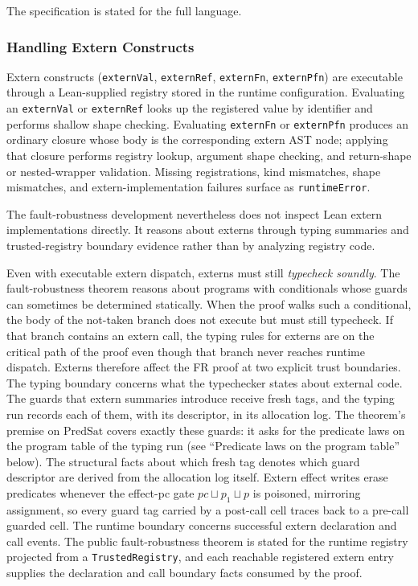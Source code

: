 \documentclass[12pt]{article}
\begin{document}
The specification is stated for the full language.

\subsubsection*{Handling Extern Constructs}

Extern constructs (\texttt{externVal}, \texttt{externRef}, \texttt{externFn},
\texttt{externPfn}) are executable through a Lean-supplied registry stored
in the runtime configuration.  Evaluating an \texttt{externVal} or
\texttt{externRef} looks up the
registered value by identifier and performs shallow shape checking.
Evaluating \texttt{externFn} or \texttt{externPfn} produces an ordinary closure
whose body is the corresponding extern AST node; applying that closure performs
registry lookup, argument shape checking, and return-shape or nested-wrapper
validation.  Missing registrations, kind mismatches, shape mismatches, and
extern-implementation failures surface as \texttt{runtimeError}.

The fault-robustness development nevertheless does not inspect Lean extern
implementations directly. It reasons about externs through typing summaries
and trusted-registry boundary evidence rather than by analyzing registry code.

Even with executable extern dispatch, externs must still \emph{typecheck
soundly}.
The fault-robustness theorem reasons about programs with conditionals whose
guards can sometimes be determined statically. When the proof walks such a
conditional, the body of the not-taken branch does not execute but must still
typecheck. If that branch contains an extern call, the typing rules for externs
are on the critical path of the proof even though that branch never reaches
runtime dispatch.
Externs therefore affect the FR proof at two explicit trust boundaries. The
typing boundary concerns what the typechecker states about external code.
The guards that extern summaries introduce receive fresh tags, and the typing
run records each of them, with its descriptor, in its allocation log.  The
theorem's premise on $\text{PredSat}$ covers exactly these guards: it asks for
the predicate laws on the program table of the typing run (see ``Predicate
laws on the program table'' below).  The structural facts about which fresh
tag denotes which guard descriptor are derived from the allocation log
itself. Extern effect writes erase predicates whenever the effect-pc gate
\(\textit{pc} \sqcup p_1 \sqcup p\) is poisoned, mirroring assignment, so
every guard tag carried by a post-call cell traces back to a pre-call
guarded cell. The runtime boundary concerns successful extern declaration and
call events. The public fault-robustness theorem is stated for the runtime
registry projected from a \texttt{TrustedRegistry}, and each reachable
registered extern entry supplies the declaration and call boundary facts
consumed by the proof.
\end{document}
